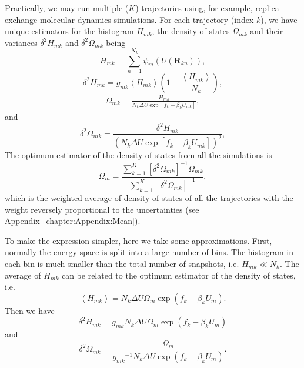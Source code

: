 Practically, we may run multiple ($K$) trajectories using, for example, replica exchange molecular dynamics simulations. For each trajectory (index $k$), we have unique estimators for the histogram $H_{mk}$, the density of states $\Omega_{mk}$ and their variances $\delta^2 H_{mk}$ and $\delta^2\Omega_{mk}$ being
\begin{equation}
	H_{mk}=\sum\limits_{n=1}^{N_k}\psi_{m}(U(\mathbf{R}_{kn})),
\end{equation}
\begin{equation}
	\delta^2 H_{mk}=g_{mk}\left<H_{mk}\right>\left(1-\frac{\left<H_{mk}\right>}{N_k}\right),
\end{equation}
\begin{align}
	\Omega_{mk}=\frac{H_{mk}}{N_k\Delta U\exp{\left[f_k-\beta_kU_{mk}\right]}},
	\label{Eq:FEM:WHAM:Omega_mk}
\end{align}
and
\begin{equation}
	\delta^2\Omega_{mk}=\frac{\delta^2 H_{mk}}{\left(N_k\Delta U\exp{\left[f_k-\beta_kU_{mk}\right]}\right)^2},
\end{equation}
The optimum estimator of the density of states from all the simulations is
\begin{equation}
	\Omega_m=\frac{\sum\limits_{k=1}^K\left[\delta^2\Omega_{mk}\right]^{-1}\Omega_{mk}}{\sum\limits_{k=1}^K\left[\delta^2\Omega_{mk}\right]^{-1}},
	\label{Eq:FEM:WHAM:optimumOmega}
\end{equation}
which is the weighted average of density of states of all the trajectories with the weight reversely proportional to the uncertainties (see Appendix~\ref{chapter:Appendix:Mean}).

To make the expression simpler, here we take some approximations. First, normally the energy space is split into a large number of bins. The histogram in each bin is much smaller than the total number of snapshots, i.e. $H_{mk}\ll N_k$. The average of $H_{mk}$ can be related to the optimum estimator of the density of states, i.e.
\begin{equation}
	\left<H_{mk}\right>=N_k\Delta U\Omega_m\exp{(f_k-\beta_kU_m)}.
\end{equation}
Then we have
\begin{equation}
    \delta^2H_{mk}=g_{mk}N_k\Delta U\Omega_m\exp{(f_k-\beta_kU_m)}
\end{equation}
and
\begin{equation}
\delta^2\Omega_{mk}=\frac{\Omega_m}{{g_{mk}}^{-1}N_k\Delta U\exp{(f_k-\beta_kU_m)}}.
\label{Eq:FEM:WHAM:delta2Omega_mk}
\end{equation}

